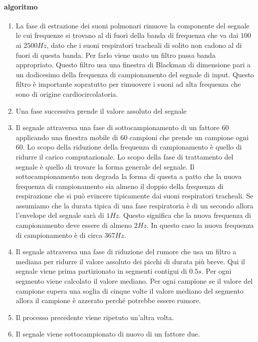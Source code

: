 \begin{frame}
  \paragraph{algoritmo}
    \begin{enumerate}
      \item 
	La fase di estrazione dei suoni polmonari rimuove la componente del segnale le cui frequenze si trovano al di fuori della banda di frequenza che va dai $100$ ai $2500Hz$, dato che i suoni respiratori tracheali di solito non cadono al di fuori di questa banda. 
	Per farlo viene usato un filtro passa banda appropriato. 
	Questo filtro usa una finestra di Blackman di dimensione pari a un dodicesimo della frequenza di campionamento del segnale di input. 
	Questo filtro \`e importante sopratutto per rimuovere i suoni ad alta frequenza che sono di origine cardiocircolatoria. 
      \item
	Una fase successiva prende il valore assoluto del segnale
      \item
	Il segnale attraversa una fase di sottocampionamento di un fattore $60$ applicando una finestra mobile di $60$ campioni che prende un campione ogni $60$. 
	Lo scopo della riduzione della frequenza di campionamento \`e quello di ridurre il carico computazionale. 
	Lo scopo della fase di trattamento del segnale \`e quello di trovare la forma generale del segnale. 
	Il sottocampionamento non degrada la forma di questa a patto che la nuova frequenza di campionamento sia almeno il doppio della frequenza di respirazione che si pu\`o evincere tipicamente dai suoni respiratori tracheali. 
	Se assumiamo che la durata tipica di una fase respiratoria \`e di un secondo allora l'envelope del segnale sar\`a di $1Hz$. 
	Questo significa che la nuova frequenza di campionamento deve essere di almeno $2Hz$. 
	In questo caso la nuova frequenza di campionamento \`e di circa $367Hz$.
      \item
	Il segnale attraversa una fase di riduzione del rumore che usa un filtro a mediana per ridurre il valore assoluto dei picchi di durata pi\`u breve. 
	Qui il segnale viene prima partizionato in segmenti contigui di $0.5s$. 
	Per ogni segmento viene calcolato il valore mediano. 
	Per ogni campione se il valore del campione supera una soglia di cinque volte il valore mediano del segmento allora il campione \`e azzerato perch\'e potrebbe essere rumore. 
      \item
	Il processo precedente viene ripetuto un'altra volta.
      \item
	Il segnale viene sottocampionato di nuovo di un fattore due.

\end{enumerate}
\end{frame}

